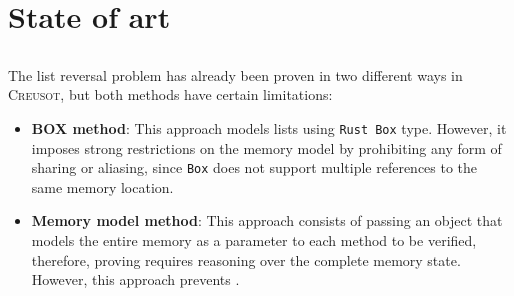 \chapter{State of art}
\section{}

\section{}
The list reversal problem has already been proven in two different ways in \textsc{Creusot}, but both methods have certain limitations:

\begin{itemize}
\item \textbf{\textsc{BOX} method}: This approach models lists using \texttt{Rust Box} type. However, it imposes strong restrictions on the memory model by prohibiting any form of sharing or aliasing, since \texttt{Box} does not support multiple references to the same memory location.
\item \textbf{Memory model method}: This approach consists of passing an object that models the entire memory as a parameter to each method to be verified, therefore, proving requires reasoning over the complete memory state. However, this approach prevents .
\end{itemize}